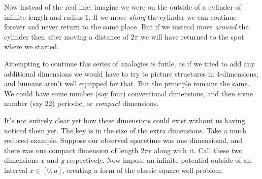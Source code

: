\documentclass[a4paper,12pt]{article}
\numberwithin{equation}{section}
\begin{document}
Now instead of the real line, imagine we were on the outside of a cylinder of infinite length and radius 1. If we move \emph{along} the cylinder we can continue forever and never return to the same place. But if we instead move \emph{around} the cylinder then after moving a distance of $2\pi$ we will have returned to the spot where we started.

Attempting to continue this series of analogies is futile, as if we tried to add any additional dimensions we would have to try to picture structures in 4-dimensions, and humans aren't well equipped for that. But the principle remains the same. We could have some number (say four) conventional dimensions, and then some number (say 22) periodic, or \emph{compact} dimensions. 

It's not entirely clear yet how these dimensions could exist without us having noticed them yet. The key is in the size of the extra dimensions. Take a much reduced example. Suppose our observed spacetime was one dimensional, and there was one compact dimension of length $2\pi r$ along with it. Call these two dimensions $x$ and $y$ respectively. Now impose an infinite potential outside of an interval $x \in [0,a]$, creating a form of the classic square well problem\cite{gasiorowicz}.
\end{document}
